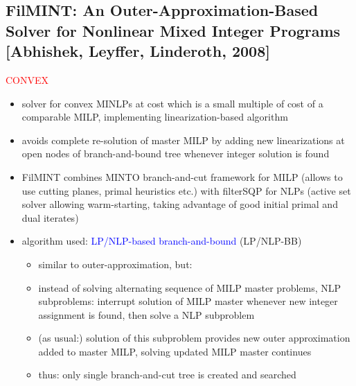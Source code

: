 \documentclass{article}
\begin{document}
\subsection{FilMINT: An Outer-Approximation-Based Solver for Nonlinear Mixed Integer Programs [Abhishek, Leyffer, Linderoth, 2008]}
\textcolor{red}{CONVEX}
\begin{itemize}
\item solver for convex MINLPs at cost which is a small multiple of cost of a comparable MILP, implementing linearization-based algorithm
\item avoids complete re-solution of master MILP by adding new linearizations at open nodes of branch-and-bound tree whenever integer solution is found
\item FilMINT combines MINTO branch-and-cut framework for MILP (allows to use cutting planes, primal heuristics etc.)  with filterSQP for NLPs (active set solver allowing warm-starting, taking advantage of good initial primal and dual iterates)
\item algorithm used: \textcolor{blue}{LP/NLP-based branch-and-bound} (LP/NLP-BB) \cite{quesada1992lp}
\begin{itemize}
\item similar to outer-approximation, but:
\item instead of solving alternating sequence of MILP master problems, NLP subproblems: interrupt solution of MILP master whenever new integer assignment is found, then solve a NLP subproblem
\item (as usual:) solution of this subproblem provides new outer approximation added to master MILP, solving updated MILP master continues
\item thus: only single branch-and-cut tree is created and searched
\end{itemize}
\end{itemize}
\end{document}
